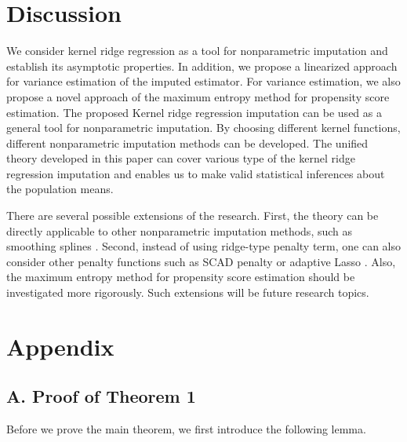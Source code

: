 \documentclass[12pt]{article}
\begin{document}
\section{Discussion}
 We consider kernel ridge regression  as a tool for nonparametric imputation and establish its asymptotic properties. In addition, we propose a linearized approach for variance estimation of the imputed estimator. For variance estimation, we also propose a novel approach of the maximum entropy method for  propensity score estimation.   The proposed Kernel ridge regression imputation can be used as a general tool for nonparametric imputation. By choosing different kernel functions, different  nonparametric imputation methods can be developed. The unified theory developed in this paper can cover various type of the kernel ridge regression imputation and enables us to make valid statistical inferences about the population means. 
 
 

There are several possible extensions of the research. First, the theory can be directly applicable to other nonparametric imputation methods, such as smoothing splines \citep{claeskens2009}. Second, instead of using ridge-type penalty term, one can also consider other penalty functions such as SCAD penalty \citep{FL2001} or adaptive Lasso \citep{zou2006}. Also, the maximum entropy method for propensity score estimation should be investigated more rigorously. Such extensions will be future research topics. 

\appendix

\section*{Appendix} 
\subsection*{A. 
Proof of Theorem 1 }

\renewcommand{\theequation}{A.\arabic{equation}}
\setcounter{equation}{0} 




Before we prove the main theorem, we first introduce the following lemma. 
\end{document}
